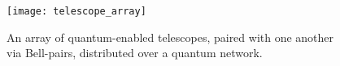 \begin{figure}[!htbp]
	\texttt{[image: telescope\_array]}
	\caption{An array of quantum-enabled telescopes, paired with one another via Bell-pairs, distributed over a quantum network.}\label{fig:telescope_array}
\end{figure}

